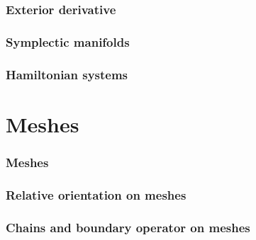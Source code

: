 \documentclass{article}
\theoremstyle{definition}
\begin{document}
\section{Exterior derivative}
\label{section:exterior_derivative}
\phantom{T}


\section{Symplectic manifolds}
\label{section:hamiltonian_systems}


\section{Hamiltonian systems}
\label{section:hamiltonian_systems}


\part{Meshes}

\section{Meshes}
\label{section:meshes}


\section{Relative orientation on meshes}
\label{section:relative_orientation_on_meshes}





\section{Chains and boundary operator on meshes}
\label{section:chains_and_boundary_operator_on_meshes}







\end{document}
